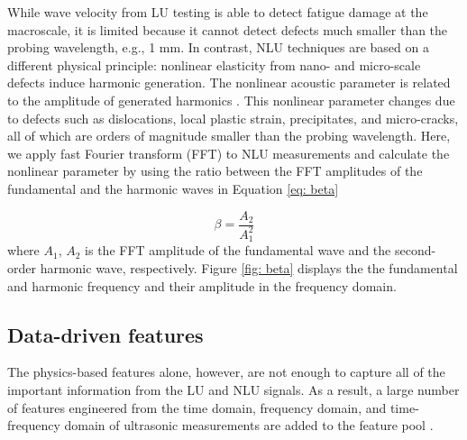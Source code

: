 \begin{itemize}
    While wave velocity from LU testing is able to detect fatigue damage at the macroscale, it is limited because it cannot detect defects much smaller than the probing wavelength, e.g., 1 mm. In contrast, NLU techniques are based on a different physical principle: nonlinear elasticity from nano- and micro-scale defects induce harmonic generation. The nonlinear acoustic parameter is related to the amplitude of generated harmonics \cite{nde-nlu-review-Matlack2014,nde-nlu-fatigue-Cantrell}. This nonlinear parameter changes due to defects such as dislocations, local plastic strain, precipitates, and micro-cracks, all of which are orders of magnitude smaller than the probing wavelength. Here, we apply fast Fourier transform (FFT) to NLU measurements and calculate the nonlinear parameter by using the ratio between the FFT amplitudes of the fundamental and the harmonic waves in Equation \eqref{eq: beta}

    \begin{equation}
        \beta = \frac{A_2}{A_1^2}
        \label{eq: beta}
    \end{equation}
    where $A_1$, $A_2$ is the FFT amplitude of the fundamental wave and the second-order harmonic wave, respectively. Figure \ref{fig: beta} displays the the fundamental and harmonic frequency and their amplitude in the frequency domain.
\end{itemize}

\subsection{Data-driven features}
The physics-based features alone, however, are not enough to capture all of the important information from the LU and NLU signals. As a result, a large number of features engineered from the time domain, frequency domain, and time-frequency domain of ultrasonic measurements are added to the feature pool \cite{nde-lu-ml-defect-Sambath2011, nde-lu-ml-defect-s19194216}.

